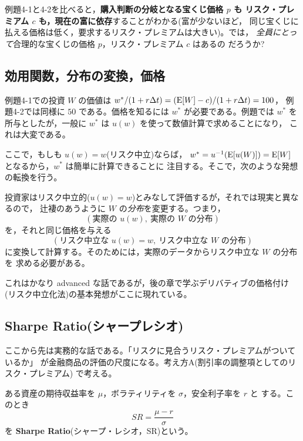 例題4-1と4-2を比べると，\textbf{購入判断の分岐となる宝くじ価格 $p$ も
リスク・プレミアム $c$ も，現在の富に依存}することがわかる(富が少ないほど，
同じ宝くじに払える価格は低く，要求するリスク・プレミアムは大きい)。では，
\emph{全員にとって}合理的な宝くじの価格 $p$，リスク・プレミアム $c$ はあるの
だろうか?

\subsection{効用関数，分布の変換，価格}

例題4-1での投資 $W$ の価値は $w^*/(1+r\Delta t) = (\mathrm{E}[W]-c)/(1+r\Delta t) = 100$，
例題4-2では同様に $50$ である。価格を知るには $w^*$ が必要である。例題では
$w^*$ を所与としたが，一般に $w^*$ は $u(w)$ を使って数値計算で求めることになり，
これは大変である。

ここで，もしも $u(w) = w$(リスク中立)ならば，
$w^* = u^{-1}(\mathrm{E}[u(W)]) = \mathrm{E}[W]$ となるから，$w^*$ は簡単に計算できることに
注目する。そこで，次のような発想の転換を行う。

\begin{keypoint}
投資家はリスク中立的($u(w)=w$)とみなして評価するが，それでは現実と異なるので，
辻褄のあうように $W$ の\emph{分布}を変更する。つまり，
\[
(\text{実際の } u(w),\ \text{実際の } W \text{ の分布})
\]
を，それと同じ価格を与える
\[
(\text{リスク中立な } u(w)=w,\ \text{リスク中立な } W \text{ の分布})
\]
に変換して計算する。そのためには，実際のデータからリスク中立な $W$ の分布を
求める必要がある。
\end{keypoint}

これはかなり advanced な話であるが，後の章で学ぶデリバティブの価格付け
(リスク中立化法)の基本発想がここに現れている。

\subsection{Sharpe Ratio(シャープレシオ)}

ここから先は実務的な話である。「リスクに見合うリスク・プレミアムがついているか」
が金融商品の評価の尺度になる。考え方A(割引率の調整項としてのリスク・プレミアム)
で考える。

\begin{definition}[シャープレシオ]
ある資産の期待収益率を $\mu$，ボラティリティを $\sigma$，安全利子率を $r$ と
する。このとき
\begin{equation}
SR = \frac{\mu - r}{\sigma}
\end{equation}
を \textbf{Sharpe Ratio}(シャープ・レシオ，SR)という。
\end{definition}

